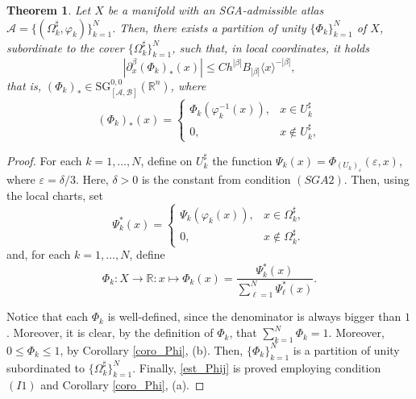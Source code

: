 \documentclass[11pt,reqno]{amsart}
\numberwithin{equation}{section}
\newtheorem{theorem}{Theorem}[section]
\newcommand{\R}{{\mathbb{R}}} %
\newcommand{\SG}{{\mathrm{SG}}}
\newcommand{\A}{{\mathcal{A}}} %
\newcommand{\B}{{\mathcal{B}}} %
\begin{document}
\begin{theorem}\label{thm_part}
	Let $X$ be a manifold with an SGA-admissible atlas $\mathscr{A}=\{(\Omega_k^\sharp,\varphi_k)\}_{k=1}^N$. 
	Then, there exists a partition of unity $\{\Phi_k\}_{k=1}^N$ of $X$, subordinate to the cover $\{\Omega_k^\sharp\}_{k=1}^N$, 
	such that, in local coordinates, it holds
	\begin{equation}\label{est_Phij}
		|\partial_x^\beta (\Phi_k)_*(x)|\leq Ch^{|\beta|}B_{|\beta|}\langle x\rangle^{-|\beta|},
	\end{equation}
	that is, $(\Phi_k)_*\in {\SG}_{[\A,\B]}^{0,0}(\R^n)$, where
	\begin{equation*}
		(\Phi_k)_*(x) = \begin{cases}
			\Phi_k(\varphi_k^{-1}(x)),& x\in U_k^\sharp\\
			0,& x\notin U_k^\sharp,
		\end{cases}
	\end{equation*}
\end{theorem}
%
\begin{proof}
	For each $k=1,\dots,N$, define on $U_k^\sharp$ the function $\Psi_k(x)=\Phi_{(U_k)_\varepsilon}(\varepsilon,x)$, 
	where $\varepsilon=\delta/3$. Here, $\delta>0$ is the constant from condition $(SGA2)$. Then, using the local charts, set
	\[\Psi_k^*(x) =
	\begin{cases}
		\Psi_k(\varphi_k(x)),& x\in\Omega_k^\sharp, \\
		0,& x\notin\Omega_k^\sharp.
	\end{cases}\]
	and, for each $k=1,\dots,N$, define
	\begin{equation*}
		\Phi_k:X\to \mathbb{R}\colon x\mapsto \Phi_k(x) = \frac{\Psi_k^*(x)}{\sum_{\ell=1}^N\Psi_\ell^*(x)}.
	\end{equation*}
	
	Notice that each $\Phi_k$ is well-defined, since the denominator is always bigger than $1$. Moreover, 
	it is clear, by the definition of $\Phi_k$, that $\sum_{k=1}^N\Phi_k=1$. Moreover, $0\leq \Phi_k\leq 1$, by Corollary \ref{coro_Phi}, (b). 
	Then, $\{\Phi_k\}_{k=1}^N$ is a partition of unity subordinated to $\{\Omega_k^\sharp\}_{k=1}^N$. Finally, \eqref{est_Phij} 
	is proved employing condition $(I1)$ and Corollary \ref{coro_Phi}, (a).
\end{proof}
\end{document}
